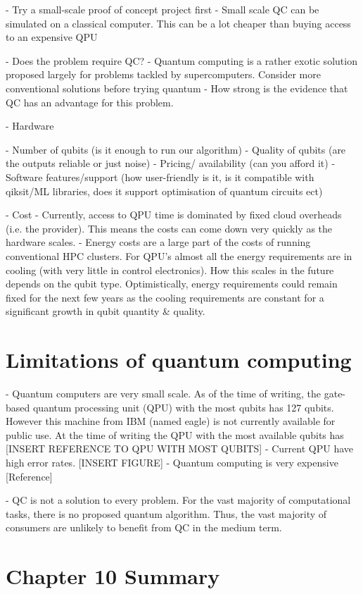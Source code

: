 \documentclass{book}
\begin{document}
- Try a small-scale proof of concept project first 
    - Small scale QC can be simulated on a classical computer. This can be a lot cheaper than buying access to an expensive QPU


- Does the problem require QC?
    - Quantum computing is a rather exotic solution proposed largely for problems tackled by supercomputers. Consider more conventional solutions before trying quantum
    - How strong is the evidence that QC has an advantage for this problem. 

- Hardware 

    - Number of qubits (is it enough to run our algorithm)
    - Quality of qubits (are the outputs reliable or just noise)
    - Pricing/ availability (can you afford it)
    - Software features/support (how user-friendly is it, is it compatible with qiksit/ML libraries, does it support optimisation of quantum circuits ect)


- Cost 
    - Currently, access to QPU time is dominated by fixed cloud overheads (i.e. the provider). This means the costs can come down very quickly as the hardware scales. 
    - Energy costs are a large part of the costs of running conventional HPC clusters. For QPU's almost all the energy requirements are in cooling (with very little in control electronics). How this scales in the future depends on the qubit type. Optimistically, energy requirements could remain fixed for the next few years as the cooling requirements are constant for a significant growth in qubit quantity \& quality. 

\section{Limitations of quantum computing}

- Quantum computers are very small scale. As of the time of writing, the gate-based quantum processing unit (QPU) with the most qubits has 127 qubits. However this machine from IBM (named eagle) is not currently available for public use. At the time of writing the QPU with the most available qubits has [INSERT REFERENCE TO QPU WITH MOST QUBITS]
- Current QPU have high error rates. [INSERT FIGURE]
- Quantum computing is very expensive [Reference]

- QC is not a solution to every problem. For the vast majority of computational tasks, there is no proposed quantum algorithm. Thus, the vast majority of consumers are unlikely to benefit from QC in the medium term.


\section{Chapter 10 Summary}
\end{document}
